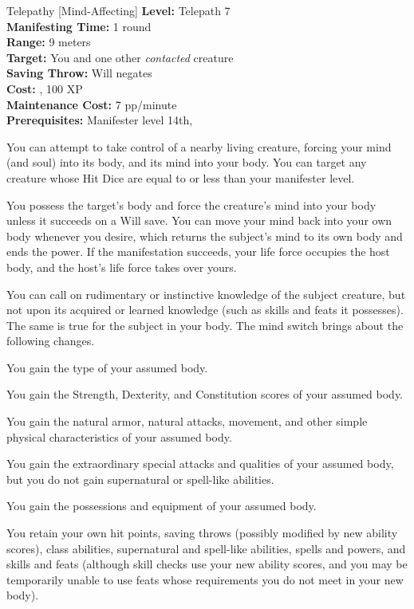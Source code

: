 {Telepathy [Mind-Affecting]}
{
	\textbf{Level:}
	Telepath 7\\
	\textbf{Manifesting Time:}
	1 round\\
	\textbf{Range:}
	9 meters\\
	\textbf{Target:}
	You and one other \emph{contacted} creature\\
	\textbf{Saving Throw:}
	Will negates\\
	\textbf{Cost:}
	, 100 XP\\
	\textbf{Maintenance Cost:}
	7 pp/minute\\
	\textbf{Prerequisites:}
	Manifester level 14th, \\
}
{
	You can attempt to take control of a nearby living creature, forcing your mind (and soul) into its body, and its mind into your body. You can target any creature whose Hit Dice are equal to or less than your manifester level.

	You possess the target's body and force the creature's mind into your body unless it succeeds on a Will save. You can move your mind back into your own body whenever you desire, which returns the subject's mind to its own body and ends the power. If the manifestation succeeds, your life force occupies the host body, and the host's life force takes over yours.

	You can call on rudimentary or instinctive knowledge of the subject creature, but not upon its acquired or learned knowledge (such as skills and feats it possesses). The same is true for the subject in your body. The mind switch brings about the following changes.

	\begin{itemize*}
    \item You gain the type of your assumed body.
    \item You gain the Strength, Dexterity, and Constitution scores of your assumed body.
    \item You gain the natural armor, natural attacks, movement, and other simple physical characteristics of your assumed body.
    \item You gain the extraordinary special attacks and qualities of your assumed body, but you do not gain supernatural or spell-like abilities.
    \item You gain the possessions and equipment of your assumed body.
    \item You retain your own hit points, saving throws (possibly modified by new ability scores), class abilities, supernatural and spell-like abilities, spells and powers, and skills and feats (although skill checks use your new ability scores, and you may be temporarily unable to use feats whose requirements you do not meet in your new body).
	\end{itemize*}

}
